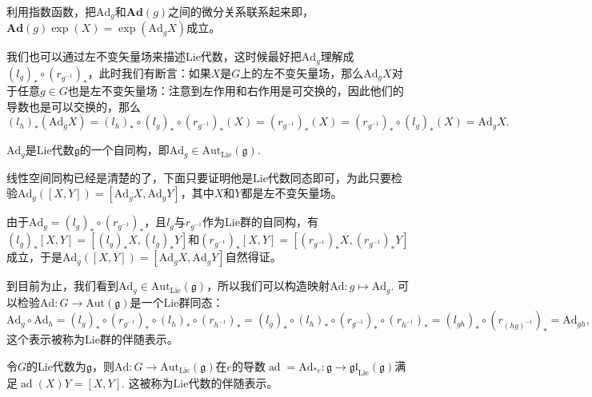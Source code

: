\documentclass[9pt]{extarticle}
\newcommand{\lag}{{\mathfrak{g}}}
\DeclareMathOperator{\ad}{ad}
\begin{document}
利用指数函数，把$\mathrm{Ad}_g$和$\mathbf{Ad}(g)$之间的微分关系联系起来即，$\mathbf{Ad}(g)\exp(X)=\exp(\mathrm{Ad}_gX)$成立。

\para 我们也可以通过左不变矢量场来描述Lie代数，这时候最好把$\mathrm{Ad}_g$理解成$(l_g)_*\circ (r_{g^{-1}})_*$，此时我们有断言：如果$X$是$G$上的左不变矢量场，那么$\mathrm{Ad}_gX$对于任意$g\in G$也是左不变矢量场：注意到左作用和右作用是可交换的，因此他们的导数也是可以交换的，那么
\[
	(l_h)_*(\mathrm{Ad}_gX)=(l_h)_*\circ (l_g)_*\circ (r_{g^{-1}})_*(X)=(r_{g^{-1}})_*(X)=(r_{g^{-1}})_*\circ (l_g)_*(X)=\mathrm{Ad}_gX.
\]

\para $\mathrm{Ad}_g$是Lie代数$\lag$的一个自同构，即$\mathrm{Ad}_g\in \mathrm{Aut}_{\mathrm{Lie}}(\lag)$.

线性空间同构已经是清楚的了，下面只要证明他是Lie代数同态即可，为此只要检验$\mathrm{Ad}_g([X,Y])=[\mathrm{Ad}_gX,\mathrm{Ad}_gY]$，其中$X$和$Y$都是左不变矢量场。

由于$\mathrm{Ad}_g=(l_g)_*\circ (r_{g^{-1}})_*$，且$l_g$与$r_{g^{-1}}$作为Lie群的自同构，有$(l_g)_*[X,Y]=[(l_g)_*X,(l_g)_*Y]$和$(r_{g^{-1}})_*[X,Y]=[(r_{g^{-1}})_*X,(r_{g^{-1}})_*Y]$成立，于是$\mathrm{Ad}_g([X,Y])=[\mathrm{Ad}_gX,\mathrm{Ad}_gY]$自然得证。

\para 到目前为止，我们看到$\mathrm{Ad}_g\in \mathrm{Aut}_{\mathrm{Lie}}(\lag)$，所以我们可以构造映射$\mathrm{Ad}:g\mapsto \mathrm{Ad}_g$. 可以检验$\mathrm{Ad}:G\to \mathrm{Aut}(\lag)$是一个Lie群同态：
\[\mathrm{Ad}_g\circ \mathrm{Ad}_h=(l_g)_*\circ (r_{g^{-1}})_*\circ (l_h)_*\circ (r_{h^{-1}})_*=(l_g)_*\circ (l_h)_*\circ (r_{g^{-1}})_*\circ (r_{h^{-1}})_*=(l_{gh})_*\circ (r_{(hg)^{-1}})_*=\mathrm{Ad}_{gh},\]
这个表示被称为Lie群的伴随表示。


\pro 令$G$的Lie代数为$\lag$，则$\mathrm{Ad}:G\to \mathrm{Aut}_{\mathrm{Lie}}(\lag)$在$e$的导数$\ad=\mathrm{Ad}_{*e}:\lag\to \mathfrak{gl}_{\mathrm{Lie}}(\lag)$满足$\ad(X)Y=[X,Y]$. 这被称为Lie代数的伴随表示。
\end{document}
